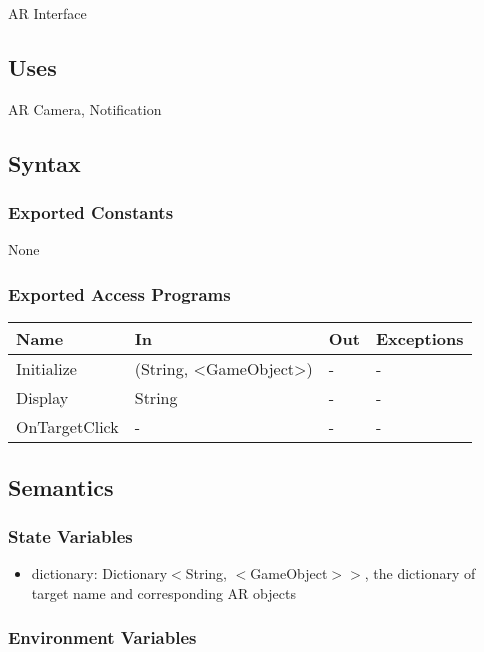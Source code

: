 \documentclass[12pt, titlepage]{article}
\begin{document}
AR Interface

\subsection{Uses}

AR Camera, Notification

\subsection{Syntax}

\subsubsection{Exported Constants}

None

\subsubsection{Exported Access Programs}

\begin{center}
\begin{tabular}{p{3cm} p{5cm} p{2cm} p{3cm}}
\hline
\textbf{Name} & \textbf{In} & \textbf{Out} & \textbf{Exceptions} \\
\hline
Initialize & (String, \textless GameObject\textgreater) & - & -\\
Display & String & - & -\\
OnTargetClick & - & - & - \\

\hline
\end{tabular}
\end{center}

\subsection{Semantics}

\subsubsection{State Variables}

\begin{itemize}
\item dictionary: Dictionary$<$String, $<$GameObject$>$$>$, the dictionary of target name and corresponding AR objects
\end{itemize}

\subsubsection{Environment Variables}
\end{document}
